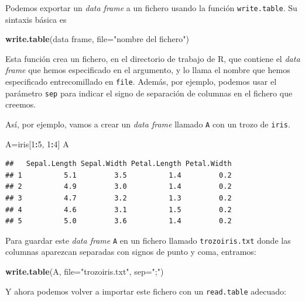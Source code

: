 \documentclass[]{book}
\newenvironment{Shaded}{\begin{snugshade}}{\end{snugshade}}
\newcommand{\DataTypeTok}[1]{\textcolor[rgb]{0.13,0.29,0.53}{#1}}
\newcommand{\DecValTok}[1]{\textcolor[rgb]{0.00,0.00,0.81}{#1}}
\newcommand{\KeywordTok}[1]{\textcolor[rgb]{0.13,0.29,0.53}{\textbf{#1}}}
\newcommand{\NormalTok}[1]{#1}
\newcommand{\OperatorTok}[1]{\textcolor[rgb]{0.81,0.36,0.00}{\textbf{#1}}}
\newcommand{\StringTok}[1]{\textcolor[rgb]{0.31,0.60,0.02}{#1}}
\theoremstyle{definition}
\theoremstyle{definition}
\theoremstyle{definition}
\theoremstyle{remark}
\begin{document}
Podemos exportar un \emph{data frame} a un fichero usando la función \texttt{write.table}. Su sintaxis básica es

\begin{Shaded}
\begin{Highlighting}[]
\KeywordTok{write.table}\NormalTok{(data frame, }\DataTypeTok{file=}\StringTok{"nombre del fichero"}\NormalTok{)}
\end{Highlighting}
\end{Shaded}

Esta función crea un fichero, en el directorio de trabajo de R, que contiene el \emph{data frame} que hemos especificado en el argumento, y lo llama el nombre que hemos especificado entrecomillado en \texttt{file}. Además, por ejemplo, podemos usar el parámetro \texttt{sep} para indicar el signo de separación de columnas en el fichero que creemos.

Así, por ejemplo, vamos a crear un \emph{data frame} llamado \texttt{A} con un trozo de \texttt{iris}.

\begin{Shaded}
\begin{Highlighting}[]
\NormalTok{A=iris[}\DecValTok{1}\OperatorTok{:}\DecValTok{5}\NormalTok{, }\DecValTok{1}\OperatorTok{:}\DecValTok{4}\NormalTok{]}
\NormalTok{A}
\end{Highlighting}
\end{Shaded}

\begin{verbatim}
##   Sepal.Length Sepal.Width Petal.Length Petal.Width
## 1          5.1         3.5          1.4         0.2
## 2          4.9         3.0          1.4         0.2
## 3          4.7         3.2          1.3         0.2
## 4          4.6         3.1          1.5         0.2
## 5          5.0         3.6          1.4         0.2
\end{verbatim}

Para guardar este \emph{data frame} \texttt{A} en un fichero llamado \texttt{trozoiris.txt} donde las columnas aparezcan separadas con signos de punto y coma, entramos:

\begin{Shaded}
\begin{Highlighting}[]
\KeywordTok{write.table}\NormalTok{(A, }\DataTypeTok{file=}\StringTok{"trozoiris.txt"}\NormalTok{, }\DataTypeTok{sep=}\StringTok{";"}\NormalTok{)}
\end{Highlighting}
\end{Shaded}

Y ahora podemos volver a importar este fichero con un \texttt{read.table} adecuado:
\end{document}
